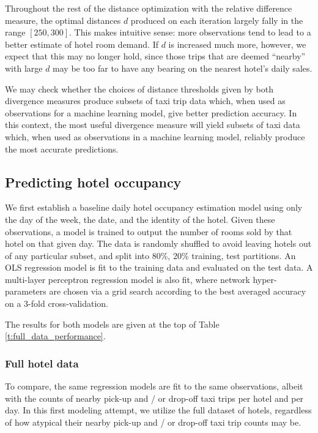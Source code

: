 \documentclass[useAMS, referee, usenatbib]{biom}
\begin{document}
Throughout the rest of the distance optimization with the relative difference measure, the optimal distances $d$ produced on each iteration largely fally in the range $[250, 300]$. This makes intuitive sense: more observations tend to lead to a better estimate of hotel room demand. If $d$ is increased much more, however, we expect that this may no longer hold, since those trips that are deemed ``nearby'' with large $d$ may be too far to have any bearing on the nearest hotel's daily sales.

We may check whether the choices of distance thresholds given by both divergence measures produce subsets of taxi trip data which, when used as observations for a machine learning model, give better prediction accuracy. In this context, the most useful divergence measure will yield subsets of taxi data which, when used as observations in a machine learning model, reliably produce the most accurate predictions.

\subsection{Predicting hotel occupancy}
\label{ss:predicting}

We first establish a baseline daily hotel occupancy estimation model using only the day of the week, the date, and the identity of the hotel. Given these observations, a model is trained to output the number of rooms sold by that hotel on that given day. The data is randomly shuffled to avoid leaving hotels out of any particular subset, and split into 80\%, 20\% training, test partitions. An OLS regression model is fit to the training data and evaluated on the test data. A multi-layer perceptron regression model is also fit, where network hyper-parameters are chosen via a grid search according to the best averaged accuracy on a 3-fold cross-validation.

The results for both models are given at the top of Table \ref{t:full_data_performance}.

\subsubsection{Full hotel data}

To compare, the same regression models are fit to the same observations, albeit with the counts of nearby pick-up and / or drop-off taxi trips per hotel and per day. In this first modeling attempt, we utilize the full dataset of hotels, regardless of how atypical their nearby pick-up and / or drop-off taxi trip counts may be.
\end{document}
